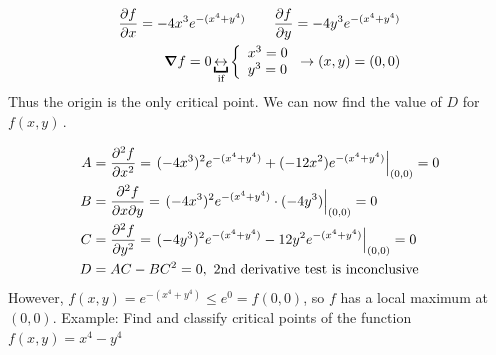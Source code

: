 \documentclass{article}
\newcommand{\nn}{\leavevmode \newline \newline} %
\newcommand{\fxy}{$f(x,y)\,$} %
\numberwithin{equation}{subsection} %
\begin{document}
\begin{equation}
    \begin{split}
        \pdv{f}{x} = -4x^3e^{-(x^4+y^4)} \qquad \pdv{f}{y} = -4y^3e^{-(x^4+y^4)} \\
        \grad f = 0 \underbracket{\leftrightarrow}_{\text{if}}
        \left\{\begin{array}{ll}
        x^3 = 0 \\ y^3 = 0
        \end{array}\right.
        \to (x,y) = (0,0)
    \end{split}
\end{equation}
Thus the origin is the only critical point. We can now find the value of $D$ for \fxy.

\begin{equation}
    \begin{split}
        A &= \pdv[2]{f}{x} =\left. (-4x^3)^2e^{-(x^4+y^4)} + (-12x^2)e^{-(x^4+y^4)} \right|_{(0,0)} = 0 \\
        B &=\pdv{f}{x}{y} = \left. (-4x^3)^2e^{-(x^4+y^4)} \cdot (-4y^3) \right|_{(0,0)} = 0 \\
        C &= \pdv[2]{f}{y} = \left. (-4y^3)^2e^{-(x^4+y^4)} - 12y^2e^{-(x^4+y^4)} \right|_{(0,0)} = 0\\
        D &= AC-BC^2 = 0, \text{ 2nd derivative test is inconclusive}
    \end{split}
\end{equation}
However, $f(x,y)=e^{-(x^4+y^4)} \leq e^0 = f(0,0)$, so $f$ has a local maximum at $(0,0)$. \nn
Example: Find and classify critical points of the function $f(x,y)=x^4-y^4$
\end{document}
